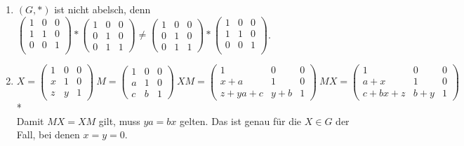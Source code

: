 \begin{enumerate}
	 \item \( (G, *) \) ist nicht abelsch, denn \( \begin{pmatrix}
	 	1 & 0 & 0 \\
	 	1 & 1 & 0 \\
	 	0 & 0 & 1 \\
	 \end{pmatrix} * \begin{pmatrix}
	 	1 & 0 & 0 \\
	 	0 & 1 & 0 \\
	 	0 & 1 & 1
	 \end{pmatrix} \neq \begin{pmatrix}
	 	1 & 0 & 0 \\
	 	0 & 1 & 0 \\
	 	0 & 1 & 1
	 \end{pmatrix} * \begin{pmatrix}
	 	1 & 0 & 0 \\
	 	1 & 1 & 0 \\
	 	0 & 0 & 1 \\
	 \end{pmatrix}  \).

	 \item \( X = \begin{pmatrix}
	 	1 & 0 & 0 \\
	 	x & 1 & 0 \\
	 	z & y & 1 
	 \end{pmatrix} \ M = \begin{pmatrix}
	 	1 & 0 & 0 \\
	 	a & 1 & 0 \\
	 	c & b & 1
	 \end{pmatrix} \ XM = \begin{pmatrix}
	 	1 & 0 & 0 \\
	 	x+a & 1 & 0 \\
	 	z + ya + c & y+b & 1
	 \end{pmatrix} \ MX = \begin{pmatrix}
	 	1 & 0 & 0 \\
	 	a+x & 1 & 0 \\
	 	c+bx+z & b+y & 1
	 \end{pmatrix} \) \\*
	 \ \\ Damit \( MX=XM \) gilt, muss \( ya=bx \) gelten. Das ist genau für die \( X \in G \) der Fall, bei denen \( x=y=0 \).
\end{enumerate}

\newpage

